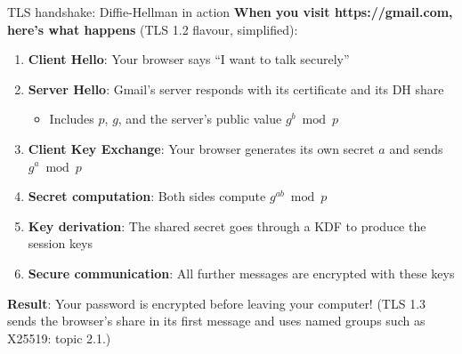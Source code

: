 \ifdefined\PRESENTATION\else\PassOptionsToClass{handout}{beamer}\fi\documentclass[aspectratio=169, lualatex]{beamer}
\begin{document}
\begin{frame}{TLS handshake: Diffie-Hellman in action}
	\textbf{When you visit https://gmail.com, here's what happens} (TLS 1.2 flavour, simplified):
	\vspace{0.2cm}
	\begin{enumerate}[<+->]
		\item \textbf{Client Hello}: Your browser says ``I want to talk securely''
		\item \textbf{Server Hello}: Gmail's server responds with its certificate and its DH share
		      \begin{itemize}
			      \item Includes $p$, $g$, and the server's public value $g^b \bmod p$
		      \end{itemize}
		\item \textbf{Client Key Exchange}: Your browser generates its own secret $a$ and sends $g^a \bmod p$
		\item \textbf{Secret computation}: Both sides compute $g^{ab} \bmod p$
		\item \textbf{Key derivation}: The shared secret goes through a KDF to produce the session keys
		\item \textbf{Secure communication}: All further messages are encrypted with these keys
	\end{enumerate}
	\vspace{0.2cm}
	\textbf{Result}: Your password is encrypted before leaving your computer! (TLS 1.3 sends the browser's share in its first message and uses named groups such as X25519: topic 2.1.)
\end{frame}
\end{document}
